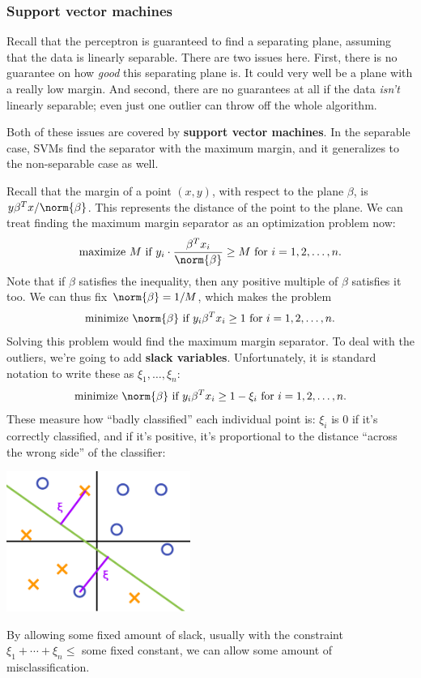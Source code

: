 \documentclass[11pt,paper=letter]{scrartcl}
\begin{document}
\subsubsection*{Support vector machines}

Recall that the perceptron is guaranteed to find a separating plane, assuming that the data is linearly separable. There are two issues here. First, there is no guarantee on how \textit{good} this separating plane is. It could very well be a plane with a really low margin. And second, there are no guarantees at all if the data \textit{isn't} linearly separable; even just one outlier can throw off the whole algorithm.

Both of these issues are covered by \textbf{support vector machines}. In the separable case, SVMs find the separator with the maximum margin, and it generalizes to the non-separable case as well.

Recall that the margin of a point $(x, y)$, with respect to the plane $\beta$, is $y \beta^T x / \norm{\beta}$. This represents the distance of the point to the plane. We can treat finding the maximum margin separator as an optimization problem now:
\[
  \text{maximize }M \text{ if } y_i \cdot \frac{\beta^Tx_i}{\norm{\beta}} \ge M \text{ for }i = 1, 2, \ldots, n.
\]
Note that if $\beta$ satisfies the inequality, then any positive multiple of $\beta$ satisfies it too. We can thus fix $\norm{\beta} = 1/M$, which makes the problem
\[
  \text{minimize }\norm{\beta} \text{ if } y_i\beta^Tx_i \ge 1 \text{ for }i = 1, 2, \ldots, n.
\]
Solving this problem would find the maximum margin separator. To deal with the outliers, we're going to add \textbf{slack variables}. Unfortunately, it is standard notation to write these as $\xi_1, \ldots, \xi_n$:
\[
  \text{minimize }\norm{\beta} \text{ if } y_i\beta^Tx_i \ge 1 - \xi_i \text{ for }i = 1, 2, \ldots, n.
\]
These measure how ``badly classified'' each individual point is: $\xi_i$ is $0$ if it's correctly classified, and if it's positive, it's proportional to the distance ``across the wrong side'' of the classifier:
\begin{center}
  \includegraphics[height=1.8in]{15.png}
\end{center}
By allowing some fixed amount of slack, usually with the constraint $\xi_1 + \cdots + \xi_n \le$ some fixed constant, we can allow some amount of misclassification.
\end{document}
